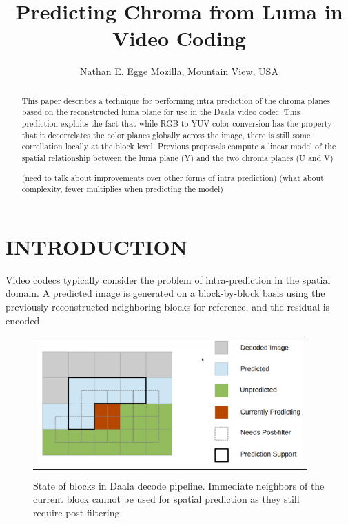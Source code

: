\documentclass[a4paper]{spie}  %
\title{Predicting Chroma from Luma in Video Coding}
\author{Nathan E. Egge
\skiplinehalf
Mozilla, Mountain View, USA
}
\begin{document}
 
  \maketitle 

\begin{abstract}
This paper describes a technique for performing intra prediction of the chroma
 planes based on the reconstructed luma plane for use in the Daala video codec.
This prediction exploits the fact that while RGB to YUV color conversion has
 the property that it decorrelates the color planes globally across the image,
 there is still some correllation locally at the block level\cite{LeeCho09}.
Previous proposals compute a linear model of the spatial relationship between
 the luma plane (Y) and the two chroma planes (U and V)\cite{JCTVCB021}

(need to talk about improvements over other forms of intra prediction)
(what about complexity, fewer multiplies when predicting the model)
\end{abstract}


\keywords{}

\section{INTRODUCTION}
\label{sec:intro}  %

Video codecs typically consider the problem of intra-prediction in the spatial
 domain.
A predicted image is generated on a block-by-block basis using the previously
 reconstructed neighboring blocks for reference, and the residual is encoded


\begin{figure}
\begin{center}
\begin{tabular}{c}
\includegraphics[natwidth=1376,natheight=646,width=4in]{daala_decode.png}
\end{tabular}
\end{center}
\caption[example]{\label{fig:example} State of blocks in Daala decode pipeline. Immediate neighbors of the current block cannot be used for spatial prediction as they still require post-filtering.}
\end{figure}
\end{document}
